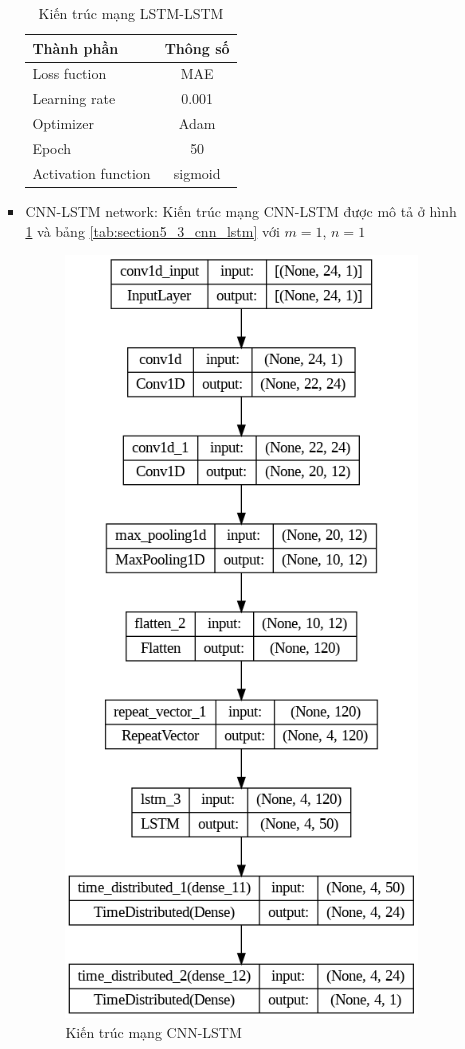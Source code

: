 \begin{itemize}
\begin{itemize}
\begin{itemize}
                    \begin{table}[h]
                        \caption{Kiến trúc mạng LSTM-LSTM}
                        \centering
                        \begin{tabular}{|l|c|}
                        \hline
                    Thành phần  &  Thông số \\
                          \hline
                     Loss fuction & MAE \\
                    Learning rate & 0.001 \\
                     Optimizer & Adam \\
                     Epoch & 50 \\
                    Activation function & sigmoid \\
                    \hline
                        \end{tabular}
                        \label{tab:section5_3_lstm_lstm}
                    \end{table}
                    
                    \newpage
                    \item CNN-LSTM network: Kiến trúc mạng CNN-LSTM được mô tả ở hình \ref{fig:section5_3_cnn_lstm} và bảng \ref{tab:section5_3_cnn_lstm} với $m=1$, $n=1$
                    \begin{figure}[h!]
                        \centering
                        \includegraphics[width=0.45\linewidth]{image/section5_3/cnn-lstm.png}
                        \caption{Kiến trúc mạng CNN-LSTM}
                        \label{fig:section5_3_cnn_lstm}
                    \end{figure}
                    

\end{itemize}
\end{itemize}
\end{itemize}
